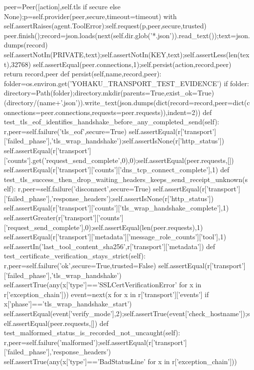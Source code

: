 {{        peer=Peer([action],self.tls if secure else None);p=self.provider(peer,secure,timeout=timeout)
        with self.assertRaises(agent.ToolError):self.request(p,peer,secure,trusted)
        peer.finish();record=json.loads(next(self.dir.glob('*.json')).read_text());text=json.dumps(record)
        self.assertNotIn(PRIVATE,text);self.assertNotIn(KEY,text);self.assertLess(len(text),32768)
        self.assertEqual(peer.connections,1);self.persist(action,record,peer)
        return record,peer
    def persist(self,name,record,peer):
        folder=os.environ.get('YOHAKU_TRANSPORT_TEST_EVIDENCE')
        if folder:
            directory=Path(folder);directory.mkdir(parents=True,exist_ok=True)
            (directory/(name+'.json')).write_text(json.dumps(dict(record=record,peer=dict(connections=peer.connections,requests=peer.requests)),indent=2))
    def test_tls_eof_identifies_handshake_before_any_completed_send(self):
        r,peer=self.failure('tls_eof',secure=True)
        self.assertEqual(r['transport']['failed_phase'],'tls_wrap_handshake');self.assertIsNone(r['http_status'])
        self.assertEqual(r['transport']['counts'].get('request_send_complete',0),0);self.assertEqual(peer.requests,[])
        self.assertEqual(r['transport']['counts']['dns_tcp_connect_complete'],1)
    def test_tls_success_then_drop_waiting_headers_keeps_send_receipt_unknown(self):
        r,peer=self.failure('disconnect',secure=True)
        self.assertEqual(r['transport']['failed_phase'],'response_headers');self.assertIsNone(r['http_status'])
        self.assertEqual(r['transport']['counts']['tls_wrap_handshake_complete'],1)
        self.assertGreater(r['transport']['counts']['request_send_complete'],0);self.assertEqual(len(peer.requests),1)
        self.assertEqual(r['transport']['metadata']['message_role_counts']['tool'],1)
        self.assertIn('last_tool_content_sha256',r['transport']['metadata'])
    def test_certificate_verification_stays_strict(self):
        r,peer=self.failure('ok',secure=True,trusted=False)
        self.assertEqual(r['transport']['failed_phase'],'tls_wrap_handshake')
        self.assertTrue(any(x['type']=='SSLCertVerificationError' for x in r['exception_chain']))
        event=next(x for x in r['transport']['events'] if x['phase']=='tls_wrap_handshake_start')
        self.assertEqual(event['verify_mode'],2);self.assertTrue(event['check_hostname']);self.assertEqual(peer.requests,[])
    def test_malformed_status_is_recorded_not_uncaught(self):
        r,peer=self.failure('malformed');self.assertEqual(r['transport']['failed_phase'],'response_headers')
        self.assertTrue(any(x['type']=='BadStatusLine' for x in r['exception_chain']))
}}
